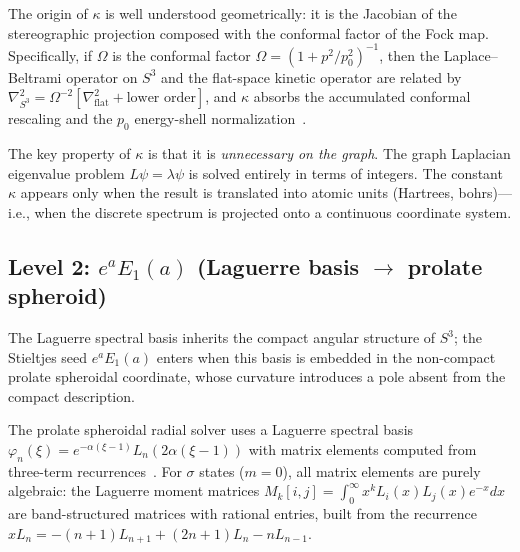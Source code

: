 \documentclass[aps,pra,twocolumn,superscriptaddress,longbibliography]{revtex4-2}
\begin{document}
The origin of $\kappa$ is well understood geometrically: it is
the Jacobian of the stereographic projection composed with the
conformal factor of the Fock map.  Specifically, if $\Omega$
is the conformal factor $\Omega = (1 + p^2/p_0^2)^{-1}$, then
the Laplace--Beltrami operator on $S^3$ and the flat-space
kinetic operator are related by
$\nabla^2_{S^3} = \Omega^{-2}[\nabla^2_{\mathrm{flat}} + \text{lower order}]$,
and $\kappa$ absorbs the accumulated conformal rescaling and
the $p_0$ energy-shell normalization~\cite{loutey_paper7}.

The key property of $\kappa$ is that it is \textit{unnecessary
on the graph}.  The graph Laplacian eigenvalue problem $L\psi =
\lambda\psi$ is solved entirely in terms of integers.  The
constant $\kappa$ appears only when the result is translated
into atomic units (Hartrees, bohrs)---i.e., when the discrete
spectrum is projected onto a continuous coordinate system.

\subsection{Level 2: $e^a E_1(a)$ (Laguerre basis $\to$ prolate spheroid)}
\label{sec:stieltjes}

The Laguerre spectral basis inherits the compact angular structure of
$S^3$; the Stieltjes seed $e^a E_1(a)$ enters when this basis is
embedded in the non-compact prolate spheroidal coordinate, whose
curvature introduces a pole absent from the compact description.

The prolate spheroidal radial solver uses a Laguerre spectral
basis $\varphi_n(\xi) = e^{-\alpha(\xi-1)} L_n(2\alpha(\xi-1))$
with matrix elements computed from three-term
recurrences~\cite{loutey_paper11}.  For $\sigma$ states ($m = 0$),
all matrix elements are purely algebraic: the Laguerre moment
matrices $M_k[i,j] = \int_0^\infty x^k L_i(x) L_j(x) e^{-x}
dx$ are band-structured matrices with rational entries, built
from the recurrence $x L_n = -(n+1)L_{n+1} + (2n+1)L_n -
nL_{n-1}$.
\end{document}

